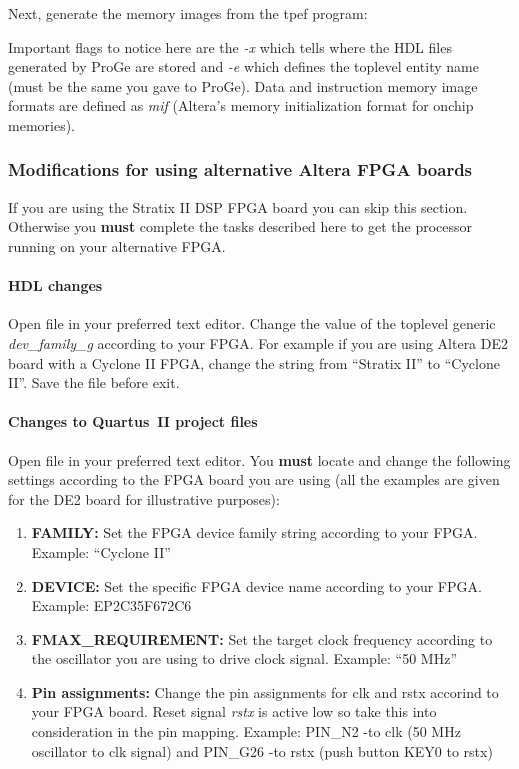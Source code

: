 \documentclass[twoside]{tceusermanual}
\begin{document}
Next, generate the memory images from the tpef program:


Important flags to notice here are the \textit{-x} which tells where
the HDL files generated by ProGe are stored and \textit{-e} which
defines the toplevel entity name (must be the same you gave to
ProGe). Data and instruction memory image formats are defined as
\textit{mif} (Altera's memory initialization format for onchip
memories).


\subsubsection{Modifications for using alternative Altera FPGA boards}

If you are using the Stratix II DSP FPGA board you can skip this
section. Otherwise you \textbf{must} complete the tasks described here
to get the processor running on your alternative FPGA.

\paragraph{HDL changes}

Open file  in your
preferred text editor. Change the value of the toplevel generic
\textit{dev\_family\_g} according to your FPGA. For example if you are
using Altera DE2 board with a Cyclone II FPGA, change the string from
``Stratix II'' to ``Cyclone II''. Save the file before exit.

\paragraph{Changes to Quartus~II project files}

Open file  in your preferred text
editor. You \textbf{must} locate and change the following settings
according to the FPGA board you are using (all the examples are given
for the DE2 board for illustrative purposes):

\begin{enumerate}
\item%
\textbf{FAMILY:} Set the FPGA device family string according to your
FPGA. Example: ``Cyclone II''

\item%
\textbf{DEVICE:} Set the specific FPGA device name according to your
FPGA. Example: EP2C35F672C6

\item%
\textbf{FMAX\_REQUIREMENT:} Set the target clock frequency according to
the oscillator you are using to drive clock signal. Example: ``50
MHz''

\item%
\textbf{Pin assignments:} Change the pin assignments for clk and rstx
accorind to your FPGA board. Reset signal \textit{rstx} is active low
so take this into consideration in the pin mapping. Example: PIN\_N2
-to clk (50 MHz oscillator to clk signal) and PIN\_G26 -to rstx (push
button KEY0 to rstx)
\end{enumerate}
\end{document}
